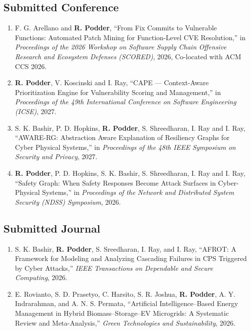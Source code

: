 \documentclass[11pt, a4paper]{article}
\begin{document}
\subsection{\color{cvred}Submitted Conference}

\begin{enumerate}[leftmargin=*, label=\arabic*., itemsep=4pt, topsep=2pt]

\item  F. G. Arellano and \textbf{\color{cvred}R. Podder}, ``From Fix Commits to Vulnerable Functions: Automated Patch Mining for Function-Level CVE Resolution,'' in \textit{Proceedings of the 2026 Workshop on Software Supply Chain Offensive Research and Ecosystem Defenses (SCORED)}, 2026, Co-located with ACM CCS 2026.

\item  \textbf{\color{cvred}R. Podder}, V. Koscinski and I. Ray, ``CAPE — Context-Aware Prioritization Engine for Vulnerability Scoring and Management,'' in \textit{Proceedings of the 49th International Conference on Software Engineering (ICSE)}, 2027.

\item  S. K. Bashir, P. D. Hopkins, \textbf{\color{cvred}R. Podder}, S. Shreedharan, I. Ray and I. Ray, ``AWARE-RG: Abstraction Aware Explanation of Resiliency Graphs for Cyber Physical Systems,'' in \textit{Proceedings of the 48th IEEE Symposium on
Security and Privacy}, 2027.

\item  \textbf{\color{cvred}R. Podder}, P. D. Hopkins, S. K. Bashir, S. Shreedharan, I. Ray and I. Ray, ``Safety Graph: When Safety Responses Become Attack Surfaces in Cyber-Physical Systems,'' in \textit{Proceedings of the Network and Distributed System Security (NDSS) Symposium}, 2026.

\end{enumerate}

\subsection{\color{cvred}Submitted Journal}

\begin{enumerate}[leftmargin=*, label=\arabic*., itemsep=4pt, topsep=2pt]
\item S. K. Bashir, \textbf{\color{cvred}R. Podder}, S. Sreedharan, I. Ray, and I. Ray, ``AFROT: A Framework for Modeling and Analyzing Cascading Failures in CPS Triggered by Cyber Attacks,'' \textit{IEEE Transactions on Dependable and Secure Computing}, 2026.

\item E. Rovianto, S. D. Prasetyo, C. Harsito, S. R. Joshua, \textbf{\color{cvred}R. Podder}, A. Y. Indrarahman, and A. N. S.
Permata, ``Artificial Intelligence–Based Energy Management in Hybrid Biomass–Storage–EV Microgrids: A
Systematic Review and Meta-Analysis,'' \textit{Green Technologies and Sustainability}, 2026.

\end{enumerate}
\end{document}

